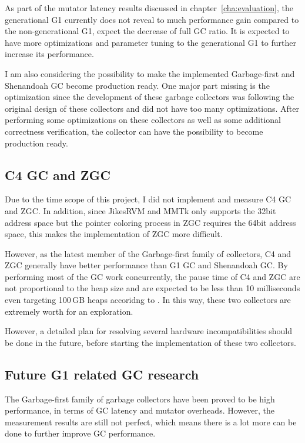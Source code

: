 As part of the mutator latency results discussed in chapter~\ref{cha:evaluation},
the generational G1 currently does not reveal to much performance gain compared to
the non-generational G1, expect the decrease of full GC ratio. It is expected to have more optimizations and parameter
tuning to the generational G1 to further increase its performance.

I am also considering the possibility to make the implemented Garbage-first
and Shenandoah GC become production ready. One major part missing is the optimization
since the development of these garbage collectors was following the original design
of these collectors and did not have too many optimizations. After performing some
optimizations on these collectors as well as some additional correctness verification,
the collector can have the possibility to become production ready.

\subsection{C4 GC and ZGC}

Due to the time scope of this project, I did not implement and measure C4 GC and ZGC.
In addition, since JikesRVM and MMTk only supports the 32bit address space but the pointer
coloring process in ZGC requires the 64bit address space, this makes the implementation
of ZGC more difficult.

However, as the latest member of the Garbage-first family of collectors, C4 and ZGC
generally have better performance than G1 GC and Shenandoah GC. By performing most of the
GC work concurrently, the pause time of C4 and ZGC are not proportional to the heap size and
are expected to be less than 10 milliseconds even targeting 100\,GB heaps accoridng to \cite{liden_karlsson_2018}.
In this way, these two collectors are extremely worth for an exploration.

However, a detailed plan for resolving several hardware incompatibilities should be done in the future,
before starting the implementation of these two collectors.

\subsection{Future G1 related GC research}

The Garbage-first family of garbage collectors have been proved to be high performance,
in terms of GC latency and mutator overheads. However, the measurement results are still
not perfect, which means there is a lot more can be done to further improve GC performance.

